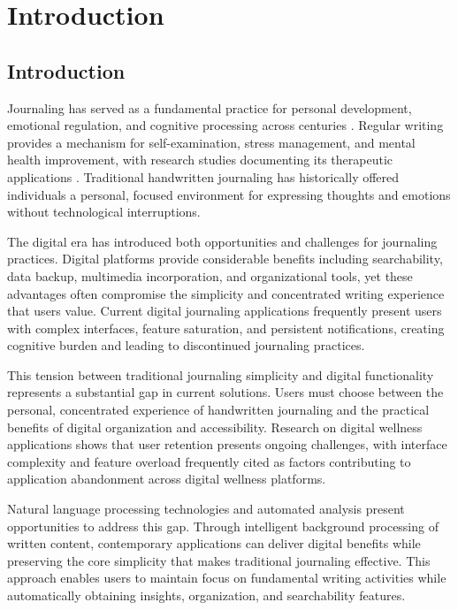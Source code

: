 \chapter{Introduction}\label{ch:intro}


\section{Introduction}\label{sec:introch1}

Journaling has served as a fundamental practice for personal development, emotional regulation, and cognitive processing across centuries \cite{pennebaker1999forming}. Regular writing provides a mechanism for self-examination, stress management, and mental health improvement, with research studies documenting its therapeutic applications \cite{sloan2015efficacy}. Traditional handwritten journaling has historically offered individuals a personal, focused environment for expressing thoughts and emotions without technological interruptions.

The digital era has introduced both opportunities and challenges for journaling practices. Digital platforms provide considerable benefits including searchability, data backup, multimedia incorporation, and organizational tools, yet these advantages often compromise the simplicity and concentrated writing experience that users value. Current digital journaling applications frequently present users with complex interfaces, feature saturation, and persistent notifications, creating cognitive burden and leading to discontinued journaling practices.

This tension between traditional journaling simplicity and digital functionality represents a substantial gap in current solutions. Users must choose between the personal, concentrated experience of handwritten journaling and the practical benefits of digital organization and accessibility. Research on digital wellness applications shows that user retention presents ongoing challenges, with interface complexity and feature overload frequently cited as factors contributing to application abandonment across digital wellness platforms.

Natural language processing technologies and automated analysis present opportunities to address this gap. Through intelligent background processing of written content, contemporary applications can deliver digital benefits while preserving the core simplicity that makes traditional journaling effective. This approach enables users to maintain focus on fundamental writing activities while automatically obtaining insights, organization, and searchability features.

